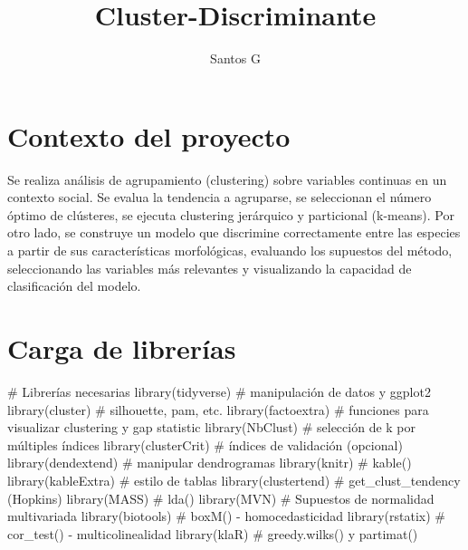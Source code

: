 \documentclass[
  spanish,
  11pt,
  a4paper,
  DIV=11,
  numbers=noendperiod]{scrartcl}
\title{Cluster-Discriminante}
\author{Santos G}
\date{}
\newenvironment{Shaded}{\begin{snugshade}}{\end{snugshade}}
\newcommand{\CommentTok}[1]{\textcolor[rgb]{0.37,0.37,0.37}{#1}}
\newcommand{\FunctionTok}[1]{\textcolor[rgb]{0.28,0.35,0.67}{#1}}
\newcommand{\NormalTok}[1]{\textcolor[rgb]{0.00,0.23,0.31}{#1}}
\renewcommand*\contentsname{Tabla de contenidos}
\newcommand\contentsname{Tabla de contenidos}
\begin{document}
\maketitle

\renewcommand*\contentsname{Tabla de contenidos}
{
\hypersetup{linkcolor=}
\setcounter{tocdepth}{2}
\tableofcontents
}

\section{Contexto del proyecto}\label{contexto-del-proyecto}

Se realiza análisis de agrupamiento (clustering) sobre variables
continuas en un contexto social. Se evalua la tendencia a agruparse, se
seleccionan el número óptimo de clústeres, se ejecuta clustering
jerárquico y particional (k-means). Por otro lado, se construye un
modelo que discrimine correctamente entre las especies a partir de sus
características morfológicas, evaluando los supuestos del método,
seleccionando las variables más relevantes y visualizando la capacidad
de clasificación del modelo.

\section{Carga de librerías}\label{carga-de-libreruxedas}

\begin{Shaded}
\begin{Highlighting}[numbers=left,,]
\CommentTok{\# Librerías necesarias}
\FunctionTok{library}\NormalTok{(tidyverse)    }\CommentTok{\# manipulación de datos y ggplot2}
\FunctionTok{library}\NormalTok{(cluster)      }\CommentTok{\# silhouette, pam, etc.}
\FunctionTok{library}\NormalTok{(factoextra)   }\CommentTok{\# funciones para visualizar clustering y gap statistic}
\FunctionTok{library}\NormalTok{(NbClust)      }\CommentTok{\# selección de k por múltiples índices}
\FunctionTok{library}\NormalTok{(clusterCrit)  }\CommentTok{\# índices de validación (opcional)}
\FunctionTok{library}\NormalTok{(dendextend)   }\CommentTok{\# manipular dendrogramas}
\FunctionTok{library}\NormalTok{(knitr)        }\CommentTok{\# kable()}
\FunctionTok{library}\NormalTok{(kableExtra)   }\CommentTok{\# estilo de tablas}
\FunctionTok{library}\NormalTok{(clustertend)  }\CommentTok{\# get\_clust\_tendency (Hopkins)}
\FunctionTok{library}\NormalTok{(MASS)         }\CommentTok{\# lda()}
\FunctionTok{library}\NormalTok{(MVN)          }\CommentTok{\# Supuestos de normalidad multivariada}
\FunctionTok{library}\NormalTok{(biotools)     }\CommentTok{\# boxM() {-} homocedasticidad}
\FunctionTok{library}\NormalTok{(rstatix)      }\CommentTok{\# cor\_test() {-} multicolinealidad}
\FunctionTok{library}\NormalTok{(klaR)         }\CommentTok{\# greedy.wilks() y partimat()}
\end{Highlighting}
\end{Shaded}
\end{document}
